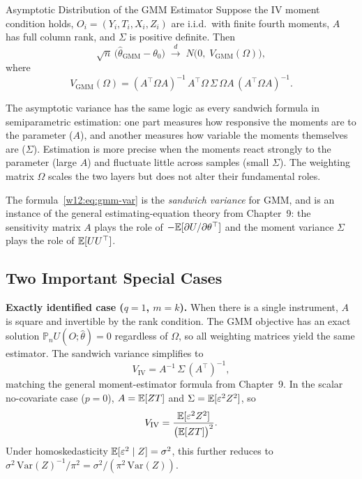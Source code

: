 \documentclass[master.tex]{subfiles}
\begin{document}
\begin{thm}{Asymptotic Distribution of the GMM Estimator}
\label{w12:thm:asym}
Suppose the IV moment condition holds, $O_i = (Y_i, T_i, X_i, Z_i)$
are i.i.d.\ with finite fourth moments, $A$ has full column rank, and
$\Sigma$ is positive definite.  Then
\[
  \sqrt{n}\,\bigl(\hat\theta_{\mathrm{GMM}} - \theta_0\bigr)
  \;\xrightarrow{d}\;
  N\bigl(0,\; V_{\mathrm{GMM}}(\Omega)\bigr),
\]
where
\begin{equation}
  V_{\mathrm{GMM}}(\Omega)
  = (A^\top\Omega A)^{-1}\,
    A^\top\Omega\,\Sigma\,\Omega A\,
    (A^\top\Omega A)^{-1}.
  \label{w12:eq:gmm-var}
\end{equation}
\end{thm}

\begin{tcolorbox}[remarkstyle, title={Intuition: the Sandwich Structure}]
The asymptotic variance has the same logic as every sandwich formula
in semiparametric estimation: one part measures how responsive the
moments are to the parameter ($A$), and another measures how variable
the moments themselves are ($\Sigma$).  Estimation is more precise
when the moments react strongly to the parameter (large $A$) and
fluctuate little across samples (small $\Sigma$).  The weighting
matrix $\Omega$ scales the two layers but does not alter their
fundamental roles.
\end{tcolorbox}

The formula~\eqref{w12:eq:gmm-var} is the \emph{sandwich variance}
for GMM, and is an instance of the general estimating-equation
theory from Chapter~9: the sensitivity matrix $A$ plays the role of
$-\mathbb{E}[\partial U/\partial\theta^\top]$ and the moment variance $\Sigma$
plays the role of $\mathbb{E}[UU^\top]$.

\subsection{Two Important Special Cases}

\textbf{Exactly identified case ($q = 1$, $m = k$).}
When there is a single instrument, $A$ is square and invertible by
the rank condition.  The GMM objective has an exact solution
$\mathbb{P}_n U(O;\hat\theta) = 0$ regardless of $\Omega$, so all
weighting matrices yield the same estimator.  The sandwich variance
simplifies to
\begin{equation}
  V_{\mathrm{IV}} = A^{-1}\,\Sigma\,(A^\top)^{-1},
  \label{w12:eq:iv-var}
\end{equation}
matching the general moment-estimator formula from Chapter~9.  In
the scalar no-covariate case ($p = 0$), $A = \mathbb{E}[ZT]$ and
$\Sigma = \mathbb{E}[\varepsilon^2 Z^2]$, so
\[
  V_{\mathrm{IV}}
  = \frac{\mathbb{E}[\varepsilon^2 Z^2]}{\bigl(\mathbb{E}[ZT]\bigr)^2}.
\]
Under homoskedasticity $\mathbb{E}[\varepsilon^2 \mid Z] = \sigma^2$, this
further reduces to $\sigma^2\,\mathrm{Var}(Z)^{-1}/\pi^2 =
\sigma^2/(\pi^2\,\mathrm{Var}(Z))$.
\end{document}
